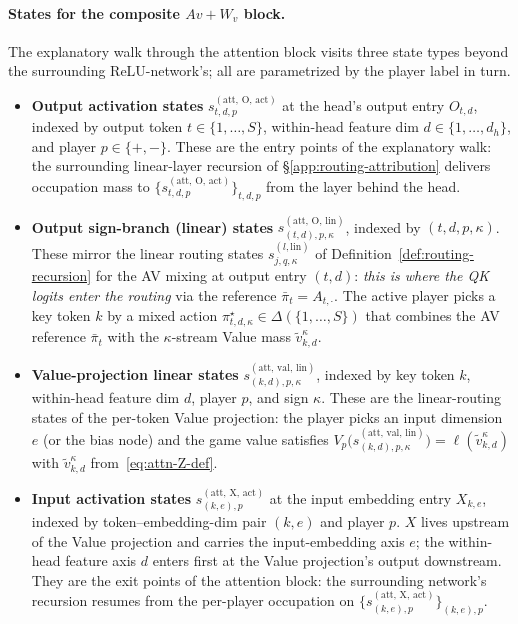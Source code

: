 \documentclass[twoside]{article}
\newcommand{\1}{\mathbf{1}}
\begin{document}
\paragraph{States for the composite $Av{+}W_v$ block.} The explanatory walk through the attention block visits three state types beyond the
surrounding ReLU-network's; all are parametrized by the player label in turn.
\begin{itemize}
    \item \textbf{Output activation states} $s_{t,d,p}^{(\mathrm{att},\,\mathrm{O},\,\mathrm{act})}$ at the
        head's output entry $O_{t,d}$, indexed by output token $t \in \{1,\dots,S\}$, within-head feature
        dim $d \in \{1,\dots,d_h\}$, and player $p \in \{+,-\}$. These are the entry points of the
        explanatory walk: the surrounding linear-layer recursion of \S\ref{app:routing-attribution}
        delivers occupation mass to $\{s_{t,d,p}^{(\mathrm{att},\,\mathrm{O},\,\mathrm{act})}\}_{t,d,p}$
        from the layer behind the head.
    \item \textbf{Output sign-branch (linear) states}
        $s_{(t,d),p,\kappa}^{(\mathrm{att},\,\mathrm{O},\,\mathrm{lin})}$, indexed by $(t, d, p, \kappa)$.
        These mirror the linear routing states $s_{j,q,\kappa}^{(l,\mathrm{lin})}$ of
        Definition~\ref{def:routing-recursion} for the AV mixing at output entry $(t, d)$: \emph{this is
        where the QK logits enter the routing} via the reference $\bar\pi_t = A_{t,\cdot}$. The active
        player picks a key token $k$ by a mixed action $\pi_{t,d,\kappa}^\star \in \Delta(\{1,\dots,S\})$
        that combines the AV reference $\bar\pi_t$ with the $\kappa$-stream Value mass
        $\tilde{v}_{k,d}^\kappa$.
    \item \textbf{Value-projection linear states}
        $s_{(k,d),p,\kappa}^{(\mathrm{att},\,\mathrm{val},\,\mathrm{lin})}$, indexed by key token $k$,
        within-head feature dim $d$, player $p$, and sign $\kappa$. These are the linear-routing states of
        the per-token Value projection: the player picks an input dimension $e$ (or the bias node) and the
        game value satisfies
        $V_p\!\bigl(s_{(k,d),p,\kappa}^{(\mathrm{att},\,\mathrm{val},\,\mathrm{lin})}\bigr) =
            \ell(\tilde{v}_{k,d}^\kappa)$ with $\tilde{v}_{k,d}^\kappa$ from~\eqref{eq:attn-Z-def}.
    \item \textbf{Input activation states} $s_{(k,e),p}^{(\mathrm{att},\,\mathrm{X},\,\mathrm{act})}$ at the
        input embedding entry $X_{k,e}$, indexed by token--embedding-dim pair $(k,e)$ and player $p$. $X$
        lives upstream of the Value projection and carries the input-embedding axis $e$; the within-head
        feature axis $d$ enters first at the Value projection's output downstream. They are the exit points
        of the attention block: the surrounding network's recursion resumes from the per-player occupation
        on $\{s_{(k,e),p}^{(\mathrm{att},\,\mathrm{X},\,\mathrm{act})}\}_{(k,e),p}$.
\end{itemize}
\end{document}
